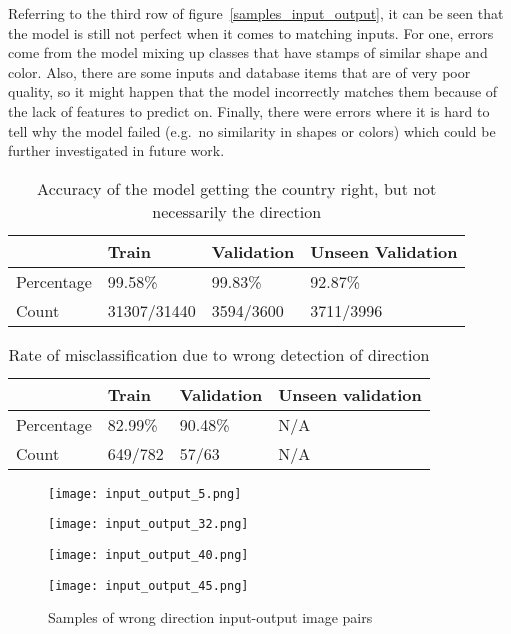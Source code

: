 \documentclass[twocolumn]{svjour3}
\begin{document}
Referring to the third row of figure~\ref{samples_input_output}, it can be seen that the model is still not perfect when it comes to matching inputs. For one, errors come from the model mixing up classes that have stamps of similar shape and color. Also, there are some inputs and database items that are of very poor quality, so it might happen that the model incorrectly matches them because of the lack of features to predict on. Finally, there were errors where it is hard to tell why the model failed (e.g.\ no similarity in shapes or colors) which could be further investigated in future work.

\begin{table}
\centering
\caption{Accuracy of the model getting the country right, but not necessarily the direction}
\label{accuracy_country}
\begin{tabular}{@{}llll@{}}
\toprule
 & Train & Validation & Unseen Validation \\
\midrule
Percentage & 99.58\% & 99.83\% & 92.87\% \\
Count & 31307/31440 & 3594/3600 & 3711/3996 \\
\bottomrule
\end{tabular}
\end{table}

\begin{table}
\centering
\caption{Rate of misclassification due to wrong detection of direction}
\label{accuracy_dir}
\begin{tabular}{@{}llll@{}}
\toprule
& Train & Validation & Unseen validation \\
\midrule
Percentage & 82.99\% & 90.48\% & N/A \\
Count & 649/782 & 57/63 & N/A \\
\bottomrule
\end{tabular}
\end{table}

\begin{figure*}
    \centering
    \begin{multicols}{2}
        \texttt{[image: input\_output\_5.png]}\par
        \texttt{[image: input\_output\_32.png]}\par
    \end{multicols}
    \begin{multicols}{2}
        \texttt{[image: input\_output\_40.png]}\par
        \texttt{[image: input\_output\_45.png]}\par
    \end{multicols}
    \caption{Samples of wrong direction input-output image pairs}
    \label{samples_input_output_direction}
\end{figure*}
\end{document}
